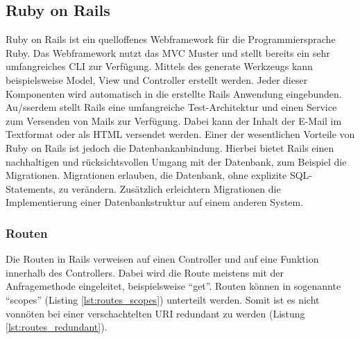 \subsection{Ruby on Rails}
\label{sec: rails}
Ruby on Rails ist ein quelloffenes Webframework für die Programmiersprache Ruby. Das Webframework nutzt das \gls{MVC} Muster und stellt bereits ein sehr umfangreiches \gls{CLI} zur Verfügung. Mittels des generate Werkzeugs kann beispielsweise Model, View und Controller erstellt werden. Jeder dieser Komponenten wird automatisch in die erstellte Rails Anwendung eingebunden. Au{/ss}erdem stellt Rails eine umfangreiche Test-Architektur und einen Service zum Versenden von Mails zur Verfügung. Dabei kann der Inhalt der E-Mail im Textformat oder als \gls{HTML} versendet werden. Einer der wesentlichen Vorteile von Ruby on Rails ist jedoch die Datenbankanbindung. Hierbei bietet Rails einen nachhaltigen und rücksichtsvollen Umgang mit der Datenbank, zum Beispiel die Migrationen. Migrationen erlauben, die Datenbank, ohne explizite SQL-Statements, zu verändern. Zusätzlich erleichtern Migrationen die Implementierung einer Datenbankstruktur auf einem anderen System.

\subsubsection{Routen}
\label{sec: routen}
Die Routen in Rails verweisen auf einen Controller und auf eine Funktion innerhalb des Controllers. Dabei wird die Route meistens mit der Anfragemethode eingeleitet, beispielsweise \enquote{get}. Routen können in sogenannte \enquote{scopes} (Listing \ref{lst:routes_scopes}) unterteilt werden. Somit ist es nicht vonnöten bei einer verschachtelten \gls{URI} redundant zu werden (Listung \ref{lst:routes_redundant}).

\begin{minipage}{\linewidth}
	
\end{minipage}

\begin{minipage}{\linewidth}
	
\end{minipage}

